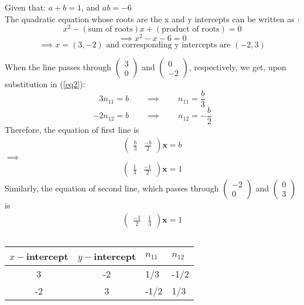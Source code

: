 \documentclass[12pt]{article}
\newcommand{\myvec}[1]{\ensuremath{\begin{pmatrix}#1\end{pmatrix}}}
\begin{document}
\noindent
Given that: \qquad \quad $ a + b = 1 $, \qquad and \qquad \quad $ ab = -6$ \\
The quadratic equation whose roots are the x and y intercepts can be written 
as :
\begin{equation*}
	x^2 - (\text{sum of roots})x + (\text{product of roots}) = 0
\end{equation*}
\begin{equation*}
	\implies x^2 - x -6 =0
\end{equation*}
\begin{equation}
	\implies x=(3,-2) \text{ and corresponding y intercepts are  } (-2,3)
\end{equation}

\noindent
When the line passes through $\myvec{3 \\ 0}$ and $\myvec{0 \\ -2}$, 
respectively,
we get, upon substitution in (\ref{eq2}):
	\[ 3 n_{11} = b \qquad \implies \qquad n_{11} = \frac{b}{3} \]
	\[-2 n_{12} = b \qquad \implies \qquad n_{12} =-\frac{b}{2} \]
Therefore, the equation of first line is
\begin{align*}
	\myvec{\frac{b}{3} & \frac{-b}{2} } {\mathbf{x}} = b
\end{align*}
%
$\implies$
\begin{align}
	\myvec{ \frac{1}{3} & \frac{-1}{2} } {\mathbf{x}} = 1
\end{align}
Similarly, the equation of second line, which passes through 
$\myvec{ -2 \\ 0}$ and $\myvec{ 0 \\ 3}$ 
is 
\begin{align}
	\myvec{ \frac{-1}{2} & \frac{1}{3} } {\mathbf{x}} = 1
\end{align}

\begin{table}[htbp]
	\centering
	\begin{tabularx}{0.7\linewidth}{|c|c|X|X|} \hline 
	$x-$intercept & $y-$intercept & $n_{11}$ & $n_{12}$ \\ \hline \hline
		3	&	-2	&	 1/3	&	-1/2 \\ \hline
  	       -2	&	 3	&	-1/2	&	 1/3 \\ \hline
	\end{tabularx}
	\caption{}
\end{table}
\end{document}
